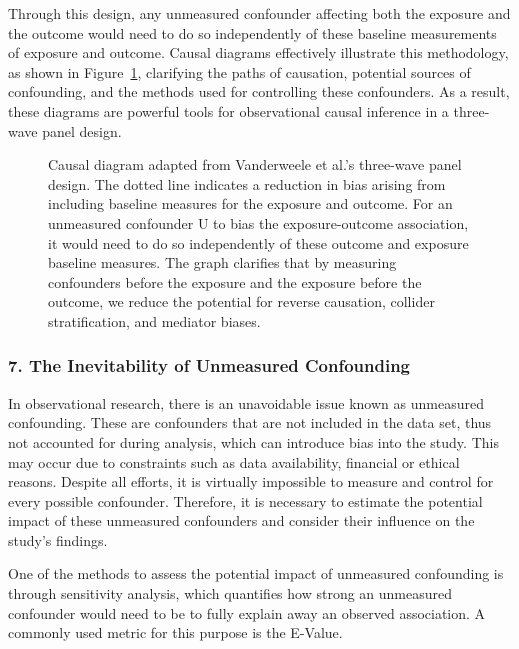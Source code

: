 \documentclass[
  singlecolumn]{article}
\begin{document}
Through this design, any unmeasured confounder affecting both the
exposure and the outcome would need to do so independently of these
baseline measurements of exposure and outcome. Causal diagrams
effectively illustrate this methodology, as shown in
Figure~\ref{fig-dag-6}, clarifying the paths of causation, potential
sources of confounding, and the methods used for controlling these
confounders. As a result, these diagrams are powerful tools for
observational causal inference in a three-wave panel design.

\begin{figure}[htb]


\caption{\label{fig-dag-6}Causal diagram adapted from Vanderweele et
al.'s three-wave panel design. The dotted line indicates a reduction in
bias arising from including baseline measures for the exposure and
outcome. For an unmeasured confounder U to bias the exposure-outcome
association, it would need to do so independently of these outcome and
exposure baseline measures. The graph clarifies that by measuring
confounders before the exposure and the exposure before the outcome, we
reduce the potential for reverse causation, collider stratification, and
mediator biases.}

\end{figure}%

\subsubsection{7. The Inevitability of Unmeasured
Confounding}\label{the-inevitability-of-unmeasured-confounding}

In observational research, there is an unavoidable issue known as
unmeasured confounding. These are confounders that are not included in
the data set, thus not accounted for during analysis, which can
introduce bias into the study. This may occur due to constraints such as
data availability, financial or ethical reasons. Despite all efforts, it
is virtually impossible to measure and control for every possible
confounder. Therefore, it is necessary to estimate the potential impact
of these unmeasured confounders and consider their influence on the
study's findings.

One of the methods to assess the potential impact of unmeasured
confounding is through sensitivity analysis, which quantifies how strong
an unmeasured confounder would need to be to fully explain away an
observed association. A commonly used metric for this purpose is the
E-Value.
\end{document}

